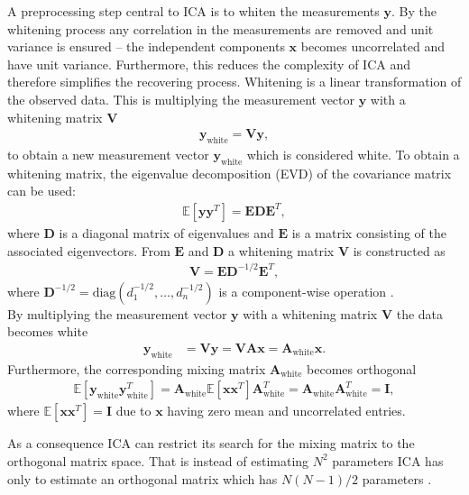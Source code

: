 A preprocessing step central to ICA is to whiten the measurements $\mathbf{y}$. 
By the whitening process any correlation in the measurements are removed and unit variance is ensured -- the independent components $\mathbf{x}$ becomes uncorrelated and have unit variance. 
Furthermore, this reduces the complexity of ICA and therefore simplifies the recovering process.
Whitening is a linear transformation of the observed data. 
This is multiplying the measurement vector $\mathbf{y}$ with a whitening matrix $\mathbf{V}$
\begin{align*}
\mathbf{y}_{\text{white}} = \mathbf{V} \mathbf{y},
\end{align*} 
to obtain a new measurement vector $\mathbf{y}_{\text{white}}$ which is considered white. 
To obtain a whitening matrix, the eigenvalue decomposition (EVD) of the covariance matrix can be used:
\begin{align*}
\mathbb{E}[\mathbf{yy}^T] = \mathbf{EDE}^T,
\end{align*}
where $\mathbf{D}$ is a diagonal matrix of eigenvalues and $\mathbf{E}$ is a matrix consisting of the associated eigenvectors. 
From $\mathbf{E}$ and $\mathbf{D}$ a whitening matrix $\mathbf{V}$ is constructed as
\begin{align*}
\mathbf{V} = \mathbf{ED}^{-1/2} \mathbf{E}^T,
\end{align*}
where $\mathbf{D}^{-1/2} = \text{diag}(d_1^{-1/2}, \dots, d_n^{-1/2})$ is a component-wise operation \cite[p. 159]{ICA}.
\\  
By multiplying the measurement vector $\mathbf{y}$ with a whitening matrix $\mathbf{V}$ the data becomes white
\begin{align*}
\mathbf{y}_{\text{white}} &= \mathbf{Vy} = \mathbf{VAx} = \mathbf{A}_{\text{white}} \mathbf{x}.
\end{align*}
Furthermore, the corresponding mixing matrix $\mathbf{A}_{\text{white}}$ becomes orthogonal 
\begin{align*}
 \mathbb{E}[\mathbf{y}_{\text{white}} \mathbf{y}_{\text{white}}^T] = \mathbf{A}_{\text{white}} \mathbb{E}[\mathbf{xx}^T] \mathbf{A}_{\text{white}}^T = \mathbf{A}_{\text{white}} \mathbf{A}_{\text{white}}^T = \mathbf{I},
 \end{align*} 
where $\mathbb{E}[\mathbf{xx}^T] = \mathbf{I}$ due to $\mathbf{x}$ having zero mean and uncorrelated entries. 

As a consequence ICA can restrict its search for the mixing matrix to the orthogonal matrix space. That is instead of estimating $N^2$ parameters ICA has only to estimate an orthogonal matrix which has $N(N-1)/2$ parameters \cite[p. 159]{ICA}.


